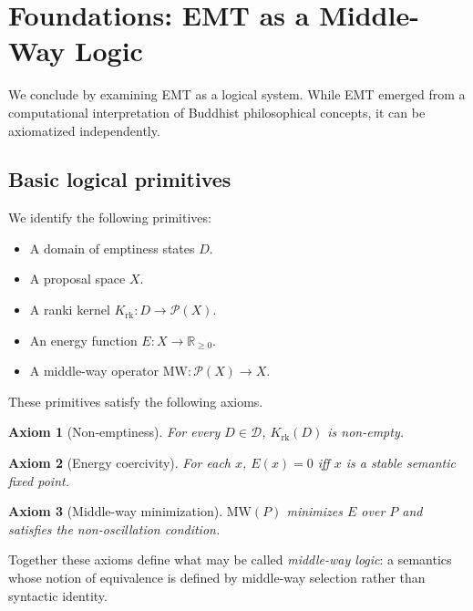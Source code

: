 \documentclass[11pt]{article}
\newtheorem{axiom}{Axiom}
\theoremstyle{definition}
\theoremstyle{remark}
\begin{document}

\section{Foundations: EMT as a Middle-Way Logic}

We conclude by examining EMT as a logical system.  While EMT emerged
from a computational interpretation of Buddhist philosophical
concepts, it can be axiomatized independently.

\subsection{Basic logical primitives}

We identify the following primitives:

\begin{itemize}
  \item A domain of emptiness states $D$.
  \item A proposal space $X$.
  \item A ranki kernel $K_{\mathrm{rk}} : D \to \mathcal{P}(X)$.
  \item An energy function $E : X \to \mathbb{R}_{\ge 0}$.
  \item A middle-way operator $\mathrm{MW}: \mathcal{P}(X)\to X$.
\end{itemize}

These primitives satisfy the following axioms.

\begin{axiom}[Non-emptiness]
For every $D \in \mathcal{D}$, $K_{\mathrm{rk}}(D)$ is non-empty.
\end{axiom}

\begin{axiom}[Energy coercivity]
For each $x$, $E(x)=0$ iff $x$ is a stable semantic fixed point.
\end{axiom}

\begin{axiom}[Middle-way minimization]
$\mathrm{MW}(P)$ minimizes $E$ over $P$ and satisfies the
non-oscillation condition.
\end{axiom}

Together these axioms define what may be called \emph{middle-way
logic}: a semantics whose notion of equivalence is defined by middle-way
selection rather than syntactic identity.
\end{document}
